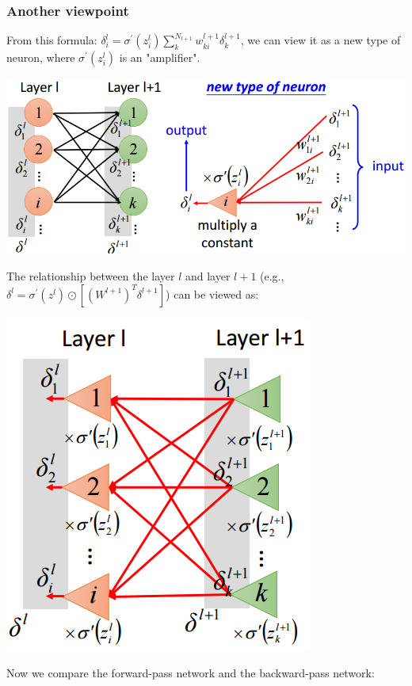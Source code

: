 \documentclass{article}
\begin{document}
\subsubsection{Another viewpoint}
From this formula: $\delta^l_i = \sigma^\prime(z^l_i)\sum^{N_{l+1}}_kw^{l+1}_{ki}\delta^{l+1}_k$, we can view it as a new type of neuron, where $\sigma^\prime(z^l_i)$ is an "amplifier".
\begin{center}
\includegraphics[scale=0.6]{new_neuron}
\end{center}
The relationship between the layer $l$ and layer $l+1$ (e.g., $\delta^l = \sigma^\prime(z^l)\odot[(W^{l+1})^T\delta^{l+1}]$) can be viewed as:
\begin{center}
\includegraphics[scale=0.6]{new_layer}
\end{center}
Now we compare the forward-pass network and the backward-pass network:
\end{document}

